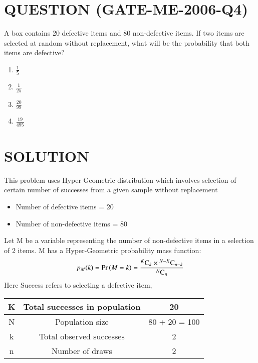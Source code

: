 \documentclass[journal,12pt,twocolumn]{IEEEtran}
\begin{document}
\section*{QUESTION (GATE-ME-2006-Q4)}
A box contains 20 defective items and 80 non-defective items. 
If two items are selected at random without replacement, 
what will be the probability that both items are defective?\bigskip
\begin{enumerate}\itemsep0.3cm
    \item $\displaystyle{\frac{1}{5}}$
    \item $\displaystyle{\frac{1}{25}}$
    \item $\displaystyle{\frac{20}{99}}$
    \item $\displaystyle{\frac{19}{495}}$
\end{enumerate}
\section*{SOLUTION}
This problem uses Hyper-Geometric distribution which involves selection of certain number of successes from a given sample without replacement
\begin{itemize}
    \item Number of defective items = 20
    \item Number of non-defective items = 80
\end{itemize}
Let M be a variable representing the number of non-defective items in a selection of 2 items.
M has a \newline Hyper-Geometric probability mass function:
\begin{equation}
    p_M(k) = \Pr\left(M = k\right) = \frac{{}^{K}\mathrm{C}_{k} \times {}^{N-K}\mathrm{C}_{n-k}}{{}^{N}\mathrm{C}_{n}}
\end{equation}
Here Success refers to selecting a defective item,
\begin{table}[H]
    \begin{center}
        \resizebox{\columnwidth}{!}
        {
            \begin{tabular}{|c|c|c|}
                \hline
                K & Total successes in population & 20\\
                \hline
                N & Population size & 80 + 20 = 100\\
                \hline
                k & Total observed successes & 2\\
                \hline
                n & Number of draws & 2\\
                \hline
            \end{tabular}
        }
    \end{center}
\end{table}
\end{document}
